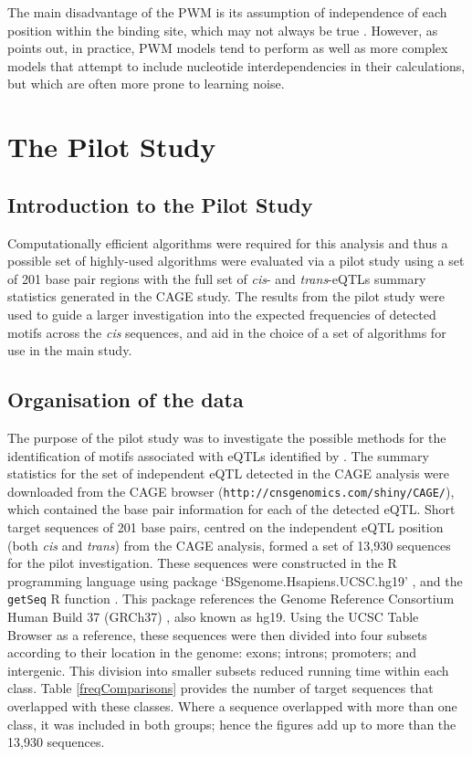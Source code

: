 \documentclass[12pt]{article}
\begin{document}
The main disadvantage of the PWM is its assumption of independence of each position within the binding site, which may not always be true \citep{Jayaram2016}. However, as \citet{Jayaram2016} points out, in practice, PWM models tend to perform as well as more complex models that attempt to include nucleotide interdependencies in their calculations, but which are often more prone to learning noise.

\section{The Pilot Study}
\subsection{Introduction to the Pilot Study}
Computationally efficient algorithms were required for this analysis and thus a possible set of highly-used algorithms were evaluated via a pilot study using a set of 201 base pair regions with the full set of \emph{cis}- and \emph{trans}-eQTLs summary statistics generated in the CAGE study. The results from the pilot study were used to guide a larger investigation into the expected frequencies of detected motifs across the \emph{cis} sequences, and aid in the choice
of a set of algorithms for use in the main study.


\subsection{Organisation of the data}

The purpose of the pilot study was to investigate the possible methods for the identification of motifs associated with eQTLs identified by  \citet{lloyd2017genetic}. The summary statistics for the set of independent eQTL detected in the CAGE analysis were downloaded from
the CAGE browser (\texttt{http://cnsgenomics.com/shiny/CAGE/}), which contained the base pair information for each of the detected eQTL. Short target sequences of 201 base pairs, centred on the independent eQTL position (both \emph{cis} and \emph{trans}) from the CAGE analysis, formed a set of 13,930 sequences for the pilot investigation. These sequences were constructed in the R programming language \citep{rcore} using package `BSgenome.Hsapiens.UCSC.hg19' \citep{teamTBD2014}, and the \texttt{getSeq} R function \citep{durinck2005biomart}. This package references the Genome Reference Consortium Human Build 37 (GRCh37) \citep{Lander2001}, also known as hg19. Using the UCSC Table Browser \citep{karolchik2004ucsc} as a reference, these sequences were then divided into four subsets according to their location in the genome: exons; introns; promoters; and intergenic. This division into smaller subsets reduced running time within each class. Table \ref{freqComparisons} provides the number of target sequences that overlapped with these classes. Where a sequence overlapped with more than one class, it was included in both groups; hence the figures add up to more than the 13,930 sequences.
\end{document}
